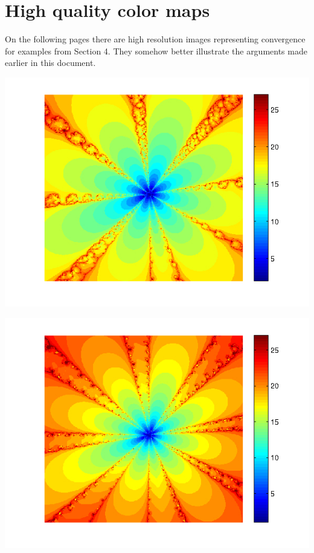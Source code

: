 \documentclass{article}
\begin{document}
\section{High quality color maps}
On the following pages there are high resolution images representing convergence for examples from
Section 4. They somehow better illustrate the arguments made earlier in this document.

\includegraphics[scale=0.95]{example1halleyHigh.jpg}

\includegraphics[scale=0.95]{example1jarrattHigh.jpg}
\end{document}
